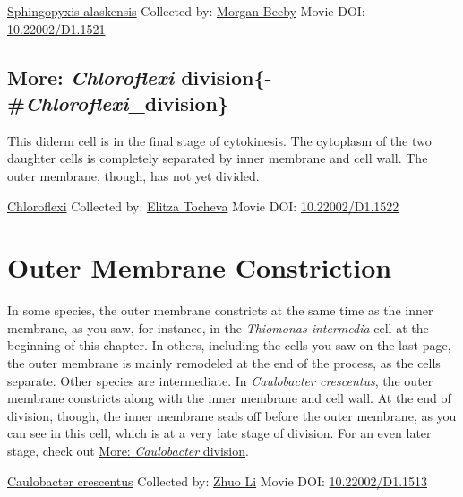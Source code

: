 \documentclass[]{tufte-book}
\begin{document}
\label{fig:5-6a}\protect\hyperlink{tree}{Sphingopyxis alaskensis} Collected by: \protect\hyperlink{morgan_beeby}{Morgan Beeby} Movie DOI: \href{https://doi.org/10.22002/D1.1521}{10.22002/D1.1521}

\hypertarget{more-chloroflexi-division-chloroflexi_division}{%
\subsection{\texorpdfstring{More: \emph{Chloroflexi} division\{-\#\emph{Chloroflexi}\_division\}}{More: Chloroflexi division\{-\#Chloroflexi\_division\}}}\label{more-chloroflexi-division-chloroflexi_division}}

This diderm cell is in the final stage of cytokinesis. The cytoplasm of the two daughter cells is completely separated by inner membrane and cell wall. The outer membrane, though, has not yet divided.



\hypertarget{htmlwidget-f84ceacf2f04c04a114f}{}

\label{fig:5-6b}\protect\hyperlink{tree}{Chloroflexi} Collected by: \protect\hyperlink{elitza_tocheva}{Elitza Tocheva} Movie DOI: \href{https://doi.org/10.22002/D1.1522}{10.22002/D1.1522}

\hypertarget{outer-membrane-constriction}{%
\section{Outer Membrane Constriction}\label{outer-membrane-constriction}}

In some species, the outer membrane constricts at the same time as the inner membrane, as you saw, for instance, in the \emph{Thiomonas intermedia} cell at the beginning of this chapter. In others, including the cells you saw on the last page, the outer membrane is mainly remodeled at the end of the process, as the cells separate. Other species are intermediate. In \emph{Caulobacter crescentus}, the outer membrane constricts along with the inner membrane and cell wall. At the end of division, though, the inner membrane seals off before the outer membrane, as you can see in this cell, which is at a very late stage of division. For an even later stage, check out \protect\hyperlink{ux2aCaulobacterux2a_division}{More: \emph{Caulobacter} division}.



\hypertarget{htmlwidget-0558453d05d2fede2058}{}

\label{fig:5-7}\protect\hyperlink{tree}{Caulobacter crescentus} Collected by: \protect\hyperlink{zhuo_li}{Zhuo Li} Movie DOI: \href{https://doi.org/10.22002/D1.1513}{10.22002/D1.1513}
\end{document}
